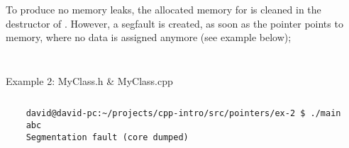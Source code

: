 	To produce no memory leaks, the allocated memory for  is cleaned in the destructor of . However, a segfault is created, as soon as the pointer points to memory, where no data is assigned anymore (see example below);
	
	\begin{listing}[!htbp]
		\begin{minipage}[t]{0.45\textwidth}
			\inputminted{cpp}{src/pointers/ex-2/MyClass.h}
		\end{minipage}\hfill
		\begin{minipage}[t]{0.45\textwidth}
			\inputminted{cpp}{src/pointers/ex-2/MyClass.cpp}
		\end{minipage}
		\caption{Example 2: MyClass.h \& MyClass.cpp}
	\end{listing}

	\inputminted{cpp}{src/pointers/ex-2/main.cpp}
	
	\begin{verbatim}
	david@david-pc:~/projects/cpp-intro/src/pointers/ex-2 $ ./main 
	abc
	Segmentation fault (core dumped)
	\end{verbatim}